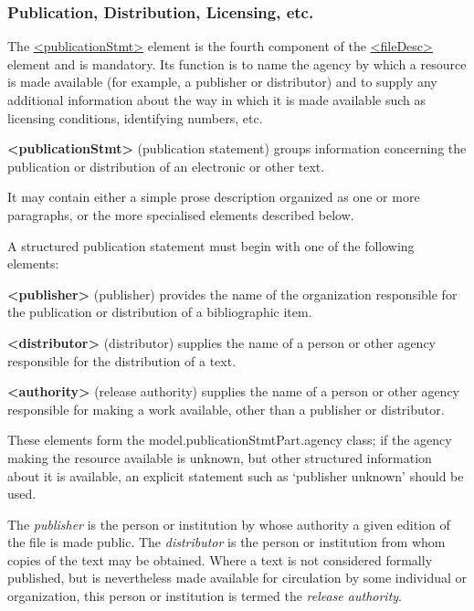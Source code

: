 \subsubsection[{Publication, Distribution, Licensing, etc.}]{Publication, Distribution, Licensing, etc.}\label{HD24}\par
The \hyperref[TEI.publicationStmt]{<publicationStmt>} element is the fourth component of the \hyperref[TEI.fileDesc]{<fileDesc>} element and is mandatory. Its function is to name the agency by which a resource is made available (for example, a publisher or distributor) and to supply any additional information about the way in which it is made available such as licensing conditions, identifying numbers, etc. 
\begin{sansreflist}
  
\item [\textbf{<publicationStmt>}] (publication statement) groups information concerning the publication or distribution of an electronic or other text.
\end{sansreflist}
 It may contain either a simple prose description organized as one or more paragraphs, or the more specialised elements described below.\par
A structured publication statement must begin with one of the following elements: 
\begin{sansreflist}
  
\item [\textbf{<publisher>}] (publisher) provides the name of the organization responsible for the publication or distribution of a bibliographic item.
\item [\textbf{<distributor>}] (distributor) supplies the name of a person or other agency responsible for the distribution of a text.
\item [\textbf{<authority>}] (release authority) supplies the name of a person or other agency responsible for making a work available, other than a publisher or distributor.
\end{sansreflist}
 These elements form the \textsf{model.publicationStmtPart.agency} class; if the agency making the resource available is unknown, but other structured information about it is available, an explicit statement such as ‘publisher unknown’ should be used.\par
The \textit{publisher} is the person or institution by whose authority a given edition of the file is made public. The \textit{distributor} is the person or institution from whom copies of the text may be obtained. Where a text is not considered formally published, but is nevertheless made available for circulation by some individual or organization, this person or institution is termed the \textit{release authority}.\par
